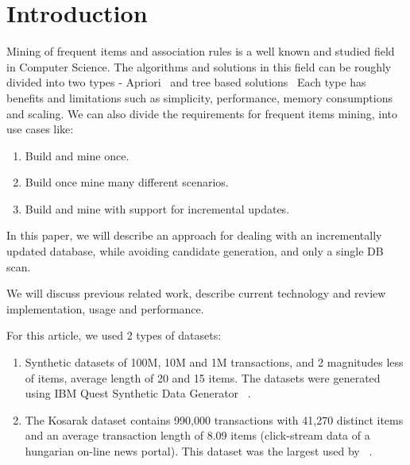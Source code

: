 \section{Introduction}
Mining of frequent items and association rules is a well known and studied field in Computer Science. The algorithms and solutions in this field can be roughly divided into two types - Apriori~\cite{agrawal1994fast} and tree based solutions~\cite{tsay2009fiut,leung2005cantree,tanbeer2009efficient} Each type has benefits and limitations such as simplicity, performance, memory consumptions and scaling. We can also divide the requirements for frequent items mining, into use cases like:
\begin{enumerate}
\item Build and mine once.
\item Build once mine many different scenarios.
\item Build and mine with support for incremental updates.
\end{enumerate}
In this paper, we will describe an approach for dealing with an incrementally updated database, while avoiding candidate generation, and only a single DB scan.

We will discuss previous related work, describe current technology and review implementation, usage and performance.

For this article, we used 2 types of datasets:
\begin{enumerate}
\item Synthetic datasets of 100M, 10M and 1M transactions, and 2 magnitudes less of items, average length of 20 and 15 items. The datasets were generated using IBM Quest Synthetic Data Generator ~\cite{agrawal1994quest}.
\item The Kosarak dataset contains 990,000 transactions with 41,270 distinct items and an average transaction length of 8.09 items (click-stream data of a hungarian on-line news portal). This dataset was the largest used by ~\cite{tanbeer2009efficient}.
\end{enumerate}

